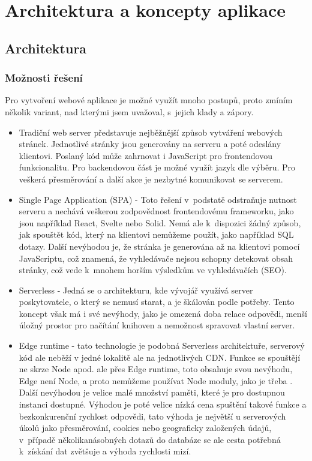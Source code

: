 \documentclass[12pt, a4paper,
openright
]{report}
\let\oldchapter\chapter
\renewcommand{\chapter}{
	\clearpage
	\pagestyle{fancy}
	\oldchapter
}
\begin{document}
\chapter{Architektura a koncepty aplikace}

\section{Architektura}

\subsection{Možnosti řešení}
Pro vytvoření webové aplikace je možné využít mnoho postupů, proto zmíním několik variant, nad kterými jsem uvažoval, s~jejich klady a zápory.

\begin{itemize}
\item Tradiční web server představuje nejběžnější způsob vytváření webových stránek. Jednotlivé stránky jsou generovány na serveru a poté odeslány klientovi. Poslaný kód může zahrnovat i JavaScript pro frontendovou funkcionalitu. Pro backendovou část je možné využít jazyk dle výběru. Pro veškerá přesměrování a další akce je nezbytné komunikovat se serverem.

\item Single Page Application (SPA) - Toto řešení v~podstatě odstraňuje nutnost serveru a nechává veškerou zodpovědnost frontendovému frameworku, jako jsou například React, Svelte nebo Solid. Nemá ale k~dispozici žádný způsob, jak spouštět kód, který na klientovi nemůžeme použít, jako například SQL dotazy. Další nevýhodou je, že stránka je generována až na klientovi pomocí JavaScriptu, což znamená, že vyhledávače nejsou schopny detekovat obsah stránky, což vede k~mnohem horším výsledkům ve vyhledávačích (SEO).

\item Serverless - Jedná se o architekturu, kde vývojář využívá server poskytovatele, o který se nemusí starat, a je škálován podle potřeby. Tento koncept však má i své nevýhody, jako je omezená doba relace odpovědi, menší úložný prostor pro načítání knihoven a nemožnost spravovat vlastní server.

\item Edge runtime - tato technologie je podobná Serverless architektuře, serverový kód ale neběží v jedné lokalitě ale na jednotlivých CDN. Funkce se spouštějí ne skrze Node apod. ale přes Edge runtime, toto obsahuje svou nevýhodu, Edge není Node, a proto nemůžeme používat Node moduly, jako je třeba . Další nevýhodou je velice malé množství paměti, které je pro dostupnou instanci dostupné. Výhodou je poté velice nízká cena spuštění takové funkce a bezkonkurenční rychlost odpovědi, tato výhoda je největší u serverových úkolů jako přesměrování, cookies nebo geograficky založených údajů, v~případě několikanásobných dotazů do databáze se ale cesta potřebná k~získání dat zvětšuje a výhoda rychlosti mizí.


\end{itemize}
\end{document}
